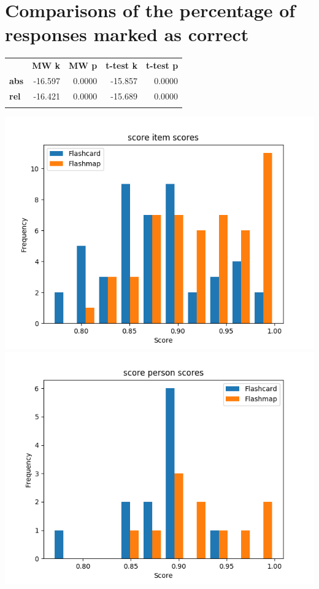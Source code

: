 \section{Comparisons of the percentage of responses marked as correct}

\begin{longtable}[c]{@{}lrrrr@{}}
\toprule\addlinespace
& \textbf{MW k} & \textbf{MW p} &
\textbf{t-test k} & \textbf{t-test p}
\\\addlinespace
\midrule
\textbf{abs} & -16.597 & 0.0000 & -15.857 & 0.0000
\\\addlinespace
\textbf{rel} & -16.421 & 0.0000 & -15.689 & 0.0000
\\\addlinespace
\bottomrule
\end{longtable}

\includegraphics{img/score_diff.png} \includegraphics{img/score_abil.png}

